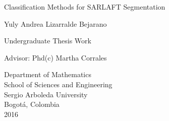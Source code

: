 \begin{titlepage}

  \begin{center}


    {\LARGE Classification Methods for SARLAFT Segmentation}

    \vspace*{\fill}

    {\large Yuly Andrea Lizarralde Bejarano}

    \vspace*{\fill}

    {\large Undergraduate Thesis Work}

    \vspace*{\fill}

    {\large Advisor:}
    {\large Phd(c) Martha Corrales}


    \vspace*{\fill}

    {\large Department of Mathematics}\\
    {\large School of Sciences and Engineering }\\
    {\large Sergio Arboleda University }\\
    {\large Bogot\'a, Colombia}\\
    {\large 2016}

  \end{center}

\end{titlepage}

%
